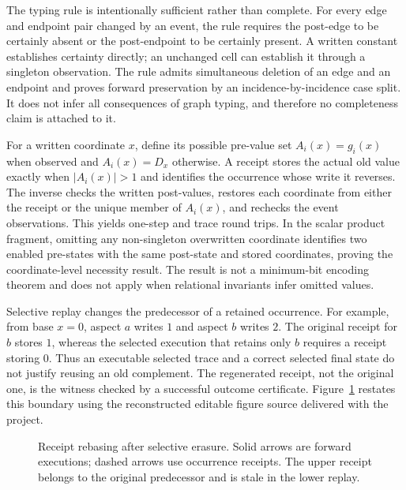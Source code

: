 The typing rule is intentionally sufficient rather than complete.  For every edge
and endpoint pair changed by an event, the rule requires the post-edge to be
certainly absent or the post-endpoint to be certainly present.  A written constant
establishes certainty directly; an unchanged cell can establish it through a
singleton observation.  The rule admits simultaneous deletion of an edge and an
endpoint and proves forward preservation by an incidence-by-incidence case split.
It does not infer all consequences of graph typing, and therefore no completeness
claim is attached to it.

For a written coordinate $x$, define its possible pre-value set
$A_i(x)=g_i(x)$ when observed and $A_i(x)=D_x$ otherwise.  A receipt stores the
actual old value exactly when $|A_i(x)|>1$ and identifies the occurrence whose
write it reverses.  The inverse checks the written post-values, restores each
coordinate from either the receipt or the unique member of $A_i(x)$, and rechecks
the event observations.  This yields one-step and trace round trips.  In the scalar
product fragment, omitting any non-singleton overwritten coordinate identifies two
enabled pre-states with the same post-state and stored coordinates, proving the
coordinate-level necessity result.  The result is not a minimum-bit encoding theorem
and does not apply when relational invariants infer omitted values.

Selective replay changes the predecessor of a retained occurrence.  For example,
from base $x=0$, aspect $a$ writes $1$ and aspect $b$ writes $2$.  The original
receipt for $b$ stores $1$, whereas the selected execution that retains only $b$
requires a receipt storing $0$.  Thus an executable selected trace and a correct
selected final state do not justify reusing an old complement.  The regenerated
receipt, not the original one, is the witness checked by a successful outcome
certificate.  Figure~\ref{fig:rebasing-app} restates this boundary using the
reconstructed editable figure source delivered with the project.

\begin{figure}[t]
  \centering
  
  \caption{Receipt rebasing after selective erasure.  Solid arrows are forward
  executions; dashed arrows use occurrence receipts.  The upper receipt belongs to
  the original predecessor and is stale in the lower replay.}
  \label{fig:rebasing-app}
\end{figure}


